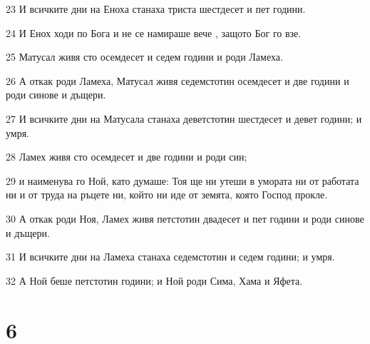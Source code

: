 \par 23 И всичките дни на Еноха станаха триста шестдесет и пет години.
\par 24 И Енох ходи по Бога и не се намираше вече , защото Бог го взе.
\par 25 Матусал живя сто осемдесет и седем години и роди Ламеха.
\par 26 А откак роди Ламеха, Матусал живя седемстотин осемдесет и две години и роди синове и дъщери.
\par 27 И всичките дни на Матусала станаха деветстотин шестдесет и девет години; и умря.
\par 28 Ламех живя сто осемдесет и две години и роди син;
\par 29 и наименува го Ной, като думаше: Тоя ще ни утеши в умората ни от работата ни и от труда на ръцете ни, който ни иде от земята, която Господ прокле.
\par 30 А откак роди Ноя, Ламех живя петстотин двадесет и пет години и роди синове и дъщери.
\par 31 И всичките дни на Ламеха станаха седемстотин и седем години; и умря.
\par 32 А Ной беше петстотин години; и Ной роди Сима, Хама и Яфета.

\chapter{6}

